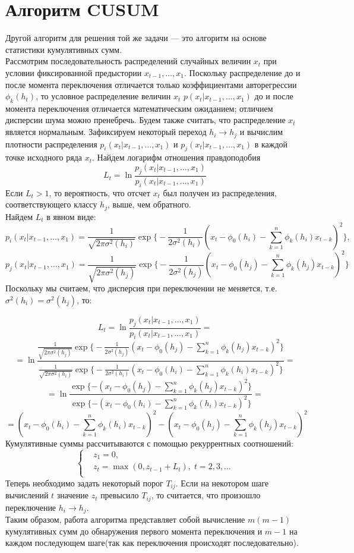 \documentclass[12pt,a4paper]{article}
\begin{document}
\section{Алгоритм CUSUM}
Другой алгоритм для решения той же задачи --- это алгоритм на основе статистики кумулятивных сумм. \\
Рассмотрим последовательность распределений случайных величин $x_t$ при условии фиксированной предыстории $x_{t-1},\dots,x_1$. Поскольку распределение до и после момента переключения отличается только коэффициентами авторегрессии $\phi_k(h_t)$, то условное распределение величин $x_t$ $p(x_t|x_{t-1},\dots,x_1)$ до и после момента переключения отличается математическим ожиданием; отличием дисперсии шума можно пренебречь. Будем также считать, что распределение $x_t$ является нормальным. Зафиксируем некоторый переход $h_i \longrightarrow h_j$ и вычислим плотности распределения $p_i(x_t|x_{t-1},\dots,x_1)$ и $p_j(x_t|x_{t-1},\dots,x_1)$ в каждой точке исходного ряда $x_t$. Найдем логарифм отношения правдоподобия
$$L_t = \ln \frac{p_j(x_t|x_{t-1},\dots,x_1)}{p_i(x_t|x_{t-1},\dots,x_1)}$$
Если $L_t > 1$, то вероятность, что отсчет $x_t$ был получен из распределения, соответствующего классу $h_j$, выше, чем обратного.\\
Найдем $L_t$ в явном виде:
$$p_i(x_t|x_{t-1},\dots,x_1) = \frac{1}{\sqrt{2\pi\sigma^2(h_i)}} \exp\bigg\{-\frac{1}{2\sigma^2(h_i)}(x_t - \phi_0(h_i) -\sum_{k=1}^{n} \phi_k(h_i) x_{t-k})^2\bigg\},$$
$$p_j(x_t|x_{t-1},\dots,x_1) = \frac{1}{\sqrt{2\pi\sigma^2(h_j)}} \exp\bigg\{-\frac{1}{2\sigma^2(h_j)}(x_t - \phi_0(h_j) -\sum_{k=1}^{n} \phi_k(h_j) x_{t-k})^2\bigg\}$$
Поскольку мы считаем, что дисперсия при переключении не меняется, т.е. $\sigma^2(h_i) = \sigma^2(h_j)$, то:

$$L_t = \ln \frac{p_j(x_t|x_{t-1},\dots,x_1)}{p_i(x_t|x_{t-1},\dots,x_1)} = $$
$$= \ln \frac{\frac{1}{\sqrt{2\pi\sigma^2(h_j)}} \exp\big\{-\frac{1}{2\sigma^2(h_j)}(x_t - \phi_0(h_j) -\sum_{k=1}^{n} \phi_k(h_j) x_{t-k})^2\big\}}{\frac{1}{\sqrt{2\pi\sigma^2(h_i)}} \exp\big\{-\frac{1}{2\sigma^2(h_i)}(x_t - \phi_0(h_i) -\sum_{k=1}^{n} \phi_k(h_i) x_{t-k})^2\big\}} =$$
$$= \ln \frac{\exp\{-(x_t - \phi_0(h_j) -\sum_{k=1}^{n} \phi_k(h_j) x_{t-k})^2\}}{\exp\{-(x_t - \phi_0(h_i) -\sum_{k=1}^{n} \phi_k(h_i) x_{t-k})^2\}} = $$
$$= (x_t - \phi_0(h_i) -\sum_{k=1}^{n} \phi_k(h_i) x_{t-k})^2 - (x_t - \phi_0(h_j) -\sum_{k=1}^{n} \phi_k(h_j) x_{t-k})^2$$
Кумулятивные суммы рассчитываются с помощью рекуррентных соотношений:
\[
\left\{
\begin{aligned}
&z_1 = 0, \\
&z_t = \max(0, z_{t-1} + L_t), \;t = 2,3,\dots \\
\end{aligned}
\right.
\]
Теперь необходимо задать некоторый порог $T_{ij}$. Если на некотором шаге вычислений $t$ значение $z_t$ превысило $T_{ij}$, то считается, что произошло переключение $h_i \longrightarrow h_j$.\\
Таким образом, работа алгоритма представляет собой вычисление $m(m-1)$ кумулятивных сумм до обнаружения первого момента переключения и $m-1$ на каждом последующем шаге(так как переключения происходят последовательно).
\end{document}
